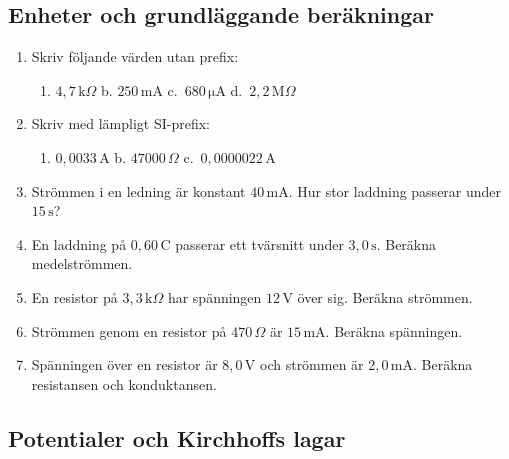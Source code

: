 \documentclass[
  swedish,
  11pt,
  a4paper,
  DIV=11,
  numbers=noendperiod,
  twoside,
  open=any]{scrreprt}
\providecommand{\tightlist}{%
  \setlength{\itemsep}{0pt}\setlength{\parskip}{0pt}}
\begin{document}
\subsection{Enheter och grundläggande
beräkningar}\label{sec-grunder-enheter-och-grundlaggande-berakningar}

\begin{enumerate}
\def\labelenumi{\arabic{enumi}.}
\setcounter{enumi}{7}
\item
  Skriv följande värden utan prefix:

  \begin{enumerate}
  \def\labelenumii{\alph{enumii}.}
  \tightlist
  \item
    \(4{,}7\,\mathrm{k}\Omega\) b. \(250\,\mathrm{mA}\)
    c.~\(680\,\mathrm{\mu A}\) d.~\(2{,}2\,\mathrm{M}\Omega\)
  \end{enumerate}
\item
  Skriv med lämpligt SI-prefix:

  \begin{enumerate}
  \def\labelenumii{\alph{enumii}.}
  \tightlist
  \item
    \(0{,}0033\,\mathrm{A}\) b. \(47000\,\Omega\)
    c.~\(0{,}0000022\,\mathrm{A}\)
  \end{enumerate}
\item
  Strömmen i en ledning är konstant \(40\,\mathrm{mA}\). Hur stor
  laddning passerar under \(15\,\mathrm{s}\)?
\item
  En laddning på \(0{,}60\,\mathrm{C}\) passerar ett tvärsnitt under
  \(3{,}0\,\mathrm{s}\). Beräkna medelströmmen.
\item
  En resistor på \(3{,}3\,\mathrm{k}\Omega\) har spänningen
  \(12\,\mathrm{V}\) över sig. Beräkna strömmen.
\item
  Strömmen genom en resistor på \(470\,\Omega\) är \(15\,\mathrm{mA}\).
  Beräkna spänningen.
\item
  Spänningen över en resistor är \(8{,}0\,\mathrm{V}\) och strömmen är
  \(2{,}0\,\mathrm{mA}\). Beräkna resistansen och konduktansen.
\end{enumerate}

\subsection{Potentialer och Kirchhoffs
lagar}\label{sec-grunder-potentialer-och-kirchhoffs-lagar}
\end{document}
